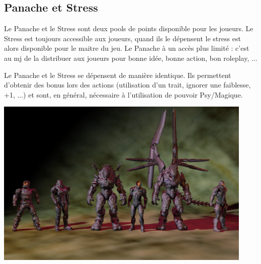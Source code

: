 \documentclass{DenebClass}
\begin{document}
\begin{multicols}{2}
\section{Panache et Stress}

Le Panache et le Stress sont deux pools de points disponible pour les joueurs. Le Stress est toujours accessible aux joueurs, quand ils le dépensent le stress est alors disponible pour le maitre du jeu. Le Panache à un accès plus limité : c'est au mj de la distribuer aux joueurs pour bonne idée, bonne action, bon roleplay, ...

Le Panache et le Stress se dépensent de manière identique. Ils permettent d'obtenir des bonus lors des actions (utilisation d'un trait, ignorer une faiblesse, +1, ...) et sont, en général, nécessaire à l'utilisation de pouvoir Psy/Magique.

\end{multicols}


\begin{center}
	\includegraphics[width=350pt]{../Img/aube_pourpre.png}
\end{center}

\end{document}
